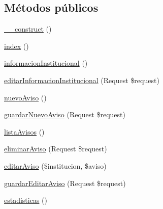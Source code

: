 \subsection*{\-Métodos públicos}
\begin{DoxyCompactItemize}
\item 
\hyperlink{class_app_1_1_http_1_1_controllers_1_1_home_controller_a095c5d389db211932136b53f25f39685}{\-\_\-\-\_\-construct} ()
\item 
\hyperlink{class_app_1_1_http_1_1_controllers_1_1_home_controller_a149eb92716c1084a935e04a8d95f7347}{index} ()
\item 
\hyperlink{class_app_1_1_http_1_1_controllers_1_1_home_controller_a2b9266e19e6e9224aaae7b4c7836ff40}{informacion\-Institucional} ()
\item 
\hyperlink{class_app_1_1_http_1_1_controllers_1_1_home_controller_adb42f8dc18c16f7d581c3615a03d6f75}{editar\-Informacion\-Institucional} (\-Request \$request)
\item 
\hyperlink{class_app_1_1_http_1_1_controllers_1_1_home_controller_ad1992463a8d72baca9db54556e0ada5a}{nuevo\-Aviso} ()
\item 
\hyperlink{class_app_1_1_http_1_1_controllers_1_1_home_controller_aa8267c0b6eb2bb4b99276eee892b81cd}{guardar\-Nuevo\-Aviso} (\-Request \$request)
\item 
\hyperlink{class_app_1_1_http_1_1_controllers_1_1_home_controller_a599f5b2f09e9ab0cba15ac2e08e2d3a4}{lista\-Avisos} ()
\item 
\hyperlink{class_app_1_1_http_1_1_controllers_1_1_home_controller_a75d08b7be79fbf0f19475105c86543fc}{eliminar\-Aviso} (\-Request \$request)
\item 
\hyperlink{class_app_1_1_http_1_1_controllers_1_1_home_controller_a38e591dabfd118030440ef4c003cc08f}{editar\-Aviso} (\$institucion, \$aviso)
\item 
\hyperlink{class_app_1_1_http_1_1_controllers_1_1_home_controller_a7a9cc6d3be72174f7e315185572208ac}{guardar\-Editar\-Aviso} (\-Request \$request)
\item 
\hyperlink{class_app_1_1_http_1_1_controllers_1_1_home_controller_a2c26c9b748066e4f390ee5172daa72b2}{estadisticas} ()
\end{DoxyCompactItemize}


